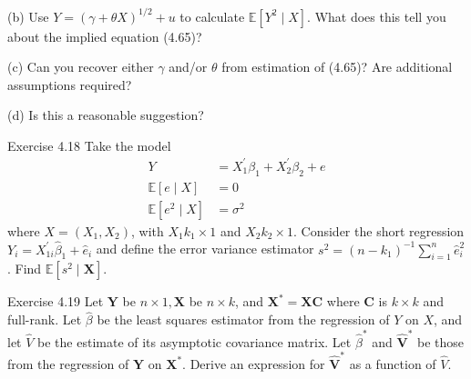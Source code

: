 \documentclass[10pt]{article}
\begin{document}
(b) Use $Y=(\gamma+\theta X)^{1 / 2}+u$ to calculate $\mathbb{E}\left[Y^{2} \mid X\right]$. What does this tell you about the implied equation (4.65)?

(c) Can you recover either $\gamma$ and/or $\theta$ from estimation of (4.65)? Are additional assumptions required?

(d) Is this a reasonable suggestion?

Exercise 4.18 Take the model
$$
\begin{aligned}
Y &=X_{1}^{\prime} \beta_{1}+X_{2}^{\prime} \beta_{2}+e \\
\mathbb{E}[e \mid X] &=0 \\
\mathbb{E}\left[e^{2} \mid X\right] &=\sigma^{2}
\end{aligned}
$$
where $X=\left(X_{1}, X_{2}\right)$, with $X_{1} k_{1} \times 1$ and $X_{2} k_{2} \times 1$. Consider the short regression $Y_{i}=X_{1 i}^{\prime} \widehat{\beta}_{1}+\widehat{e}_{i}$ and define the error variance estimator $s^{2}=\left(n-k_{1}\right)^{-1} \sum_{i=1}^{n} \widehat{e}_{i}^{2}$. Find $\mathbb{E}\left[s^{2} \mid \boldsymbol{X}\right]$.

Exercise 4.19 Let $\boldsymbol{Y}$ be $n \times 1, \boldsymbol{X}$ be $n \times k$, and $\boldsymbol{X}^{*}=\boldsymbol{X} \boldsymbol{C}$ where $\boldsymbol{C}$ is $k \times k$ and full-rank. Let $\widehat{\beta}$ be the least squares estimator from the regression of $Y$ on $X$, and let $\widehat{V}$ be the estimate of its asymptotic covariance matrix. Let $\widehat{\beta}^{*}$ and $\widehat{\boldsymbol{V}}^{*}$ be those from the regression of $\boldsymbol{Y}$ on $\boldsymbol{X}^{*}$. Derive an expression for $\widehat{\boldsymbol{V}}^{*}$ as a function of $\widehat{V}$.
\end{document}
